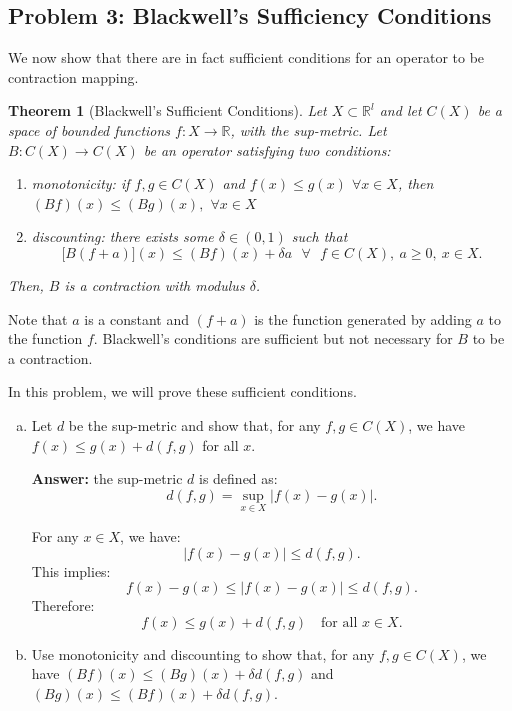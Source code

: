 \documentclass[11pt]{extarticle}
\theoremstyle{plain}
\newtheorem{thm}{Theorem}
\theoremstyle{definition}
\begin{document}
\begin{enumerate}[(a)]
\section*{Problem 3: Blackwell's Sufficiency Conditions}

We now show that there are in fact sufficient conditions for an operator to be contraction mapping.

\begin{thm}[Blackwell's Sufficient Conditions]
	
	Let $X \subset \mathbb R^l$ and let $C(X)$ be a space of bounded functions $f:X \to \mathbb R$, with the sup-metric. Let $B : C(X) \to C(X)$ be an operator satisfying two conditions:
	\begin{enumerate}[1.]
		\item monotonicity: if $f,g\in C(X)$ and $f(x)\leq g(x)$ $\forall x\in X$,%
		\newline
		then $(Bf)(x)\leq (Bg)(x),$ $\forall x\in X$\newline
		
		\item discounting: there exists some $\delta \in (0,1)$ such that 
		\[
		\lbrack B(f+a)](x)\leq (Bf)(x)+\delta a\text{ \ }\forall \text{ }f\in C(X),\
		a\geq 0,\ x\in X. 
		\]%
	\end{enumerate}
	
	\noindent
	Then, $B$ is a contraction with modulus $\delta$.

\end{thm}

\noindent
Note that $a$ is a constant and $(f+a)$ is the function generated by adding $a$ to the function $f$. Blackwell's conditions are sufficient but not necessary for $B$ to be a contraction.

\vspace{5mm}
\noindent
In this problem, we will prove these sufficient conditions.
\begin{enumerate}[(a)]
\item Let $d$ be the sup-metric and show that, for any $f, g \in C(X)$, we have $f(x) \leq g(x) + d(f, g)$ for all $x$.

\textbf{Answer: } the sup-metric $d$ is defined as:
\[
d(f, g) = \sup_{x \in X} |f(x) - g(x)|.
\]

For any $x \in X$, we have:
\[
|f(x) - g(x)| \leq d(f, g).
\]
This implies:
\[
f(x) - g(x) \leq |f(x) - g(x)| \leq d(f, g).
\]
Therefore:
\[
f(x) \leq g(x) + d(f, g) \quad \text{for all } x \in X.
\]
\item Use monotonicity and discounting to show that, for any $f, g \in C(X)$, we have $(Bf)(x) \leq (Bg)(x) + \delta d(f, g)$ and $(Bg)(x) \leq (Bf)(x) + \delta d(f, g)$. 


\end{enumerate}
\end{enumerate}
\end{document}
